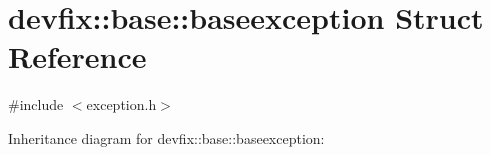 \hypertarget{structdevfix_1_1base_1_1baseexception}{}\section{devfix\+:\+:base\+:\+:baseexception Struct Reference}
\label{structdevfix_1_1base_1_1baseexception}


{\ttfamily \#include $<$exception.\+h$>$}



Inheritance diagram for devfix\+:\+:base\+:\+:baseexception\+:

